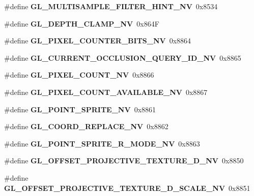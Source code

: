 \begin{DoxyCompactItemize}
\item 
\#define {\bfseries G\+L\+\_\+\+M\+U\+L\+T\+I\+S\+A\+M\+P\+L\+E\+\_\+\+F\+I\+L\+T\+E\+R\+\_\+\+H\+I\+N\+T\+\_\+\+N\+V}~0x8534\label{_s_d_l__opengl_8h_a09a7a386351a919528a05f1de4a1b63a}

\item 
\#define {\bfseries G\+L\+\_\+\+D\+E\+P\+T\+H\+\_\+\+C\+L\+A\+M\+P\+\_\+\+N\+V}~0x864\+F\label{_s_d_l__opengl_8h_ac70f5bf5cffa2d34ab430be7f227a9dc}

\item 
\#define {\bfseries G\+L\+\_\+\+P\+I\+X\+E\+L\+\_\+\+C\+O\+U\+N\+T\+E\+R\+\_\+\+B\+I\+T\+S\+\_\+\+N\+V}~0x8864\label{_s_d_l__opengl_8h_a807384bc9938bee0332e9e7d53529c59}

\item 
\#define {\bfseries G\+L\+\_\+\+C\+U\+R\+R\+E\+N\+T\+\_\+\+O\+C\+C\+L\+U\+S\+I\+O\+N\+\_\+\+Q\+U\+E\+R\+Y\+\_\+\+I\+D\+\_\+\+N\+V}~0x8865\label{_s_d_l__opengl_8h_a35f2764ee5d8eba42a94941a30f08780}

\item 
\#define {\bfseries G\+L\+\_\+\+P\+I\+X\+E\+L\+\_\+\+C\+O\+U\+N\+T\+\_\+\+N\+V}~0x8866\label{_s_d_l__opengl_8h_adb91e91e14493a8b6ea4b32125d96b0b}

\item 
\#define {\bfseries G\+L\+\_\+\+P\+I\+X\+E\+L\+\_\+\+C\+O\+U\+N\+T\+\_\+\+A\+V\+A\+I\+L\+A\+B\+L\+E\+\_\+\+N\+V}~0x8867\label{_s_d_l__opengl_8h_a06b4a45c10129a462b1f151222fb075a}

\item 
\#define {\bfseries G\+L\+\_\+\+P\+O\+I\+N\+T\+\_\+\+S\+P\+R\+I\+T\+E\+\_\+\+N\+V}~0x8861\label{_s_d_l__opengl_8h_a2ec2cfb8a19b87634e79d343067505c9}

\item 
\#define {\bfseries G\+L\+\_\+\+C\+O\+O\+R\+D\+\_\+\+R\+E\+P\+L\+A\+C\+E\+\_\+\+N\+V}~0x8862\label{_s_d_l__opengl_8h_ae29ff075e26f8e333c785c23a4c23cf7}

\item 
\#define {\bfseries G\+L\+\_\+\+P\+O\+I\+N\+T\+\_\+\+S\+P\+R\+I\+T\+E\+\_\+\+R\+\_\+\+M\+O\+D\+E\+\_\+\+N\+V}~0x8863\label{_s_d_l__opengl_8h_aeea553f994d259159f2fc77b2816bb9d}

\item 
\#define {\bfseries G\+L\+\_\+\+O\+F\+F\+S\+E\+T\+\_\+\+P\+R\+O\+J\+E\+C\+T\+I\+V\+E\+\_\+\+T\+E\+X\+T\+U\+R\+E\+\_\+D\+\_\+\+N\+V}~0x8850\label{_s_d_l__opengl_8h_aec9b90753b27923b2963cbbec93314aa}

\item 
\#define {\bfseries G\+L\+\_\+\+O\+F\+F\+S\+E\+T\+\_\+\+P\+R\+O\+J\+E\+C\+T\+I\+V\+E\+\_\+\+T\+E\+X\+T\+U\+R\+E\+\_\+D\+\_\+\+S\+C\+A\+L\+E\+\_\+\+N\+V}~0x8851\label{_s_d_l__opengl_8h_a642711adcf77dd962b71430b120cbf74}


\end{DoxyCompactItemize}
